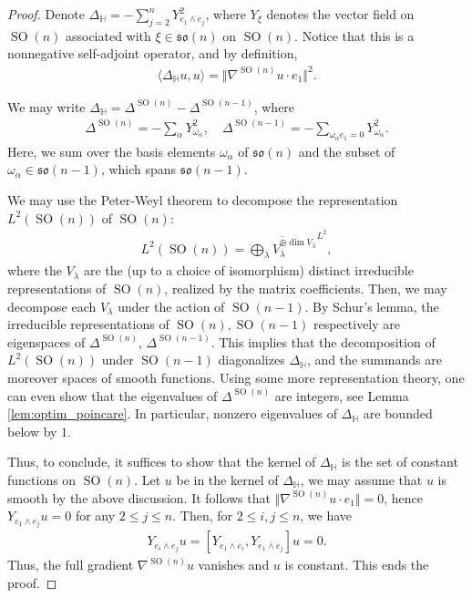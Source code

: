 \documentclass[12pt]{amsart}
\numberwithin{numbering}{section}
\theoremstyle{plain}
\theoremstyle{definition}
\theoremstyle{remark}
\numberwithin{equation}{section}
\DeclareMathOperator{\SO}{SO}
\newcommand{\HH}{\mathbb{H}}
\newcommand{\frk}[1]{\mathfrak{#1}}
\begin{document}
\begin{proof}
Denote $\Delta_{\HH} = - \sum_{j=2}^n Y_{e_1 \wedge e_j}^2$, where $Y_\xi$ denotes the vector field on $\SO(n)$ associated with $\xi \in \frk{so}(n)$ on $\SO(n)$. Notice that this is a nonnegative self-adjoint operator, and by definition,
\begin{align*}
\langle \Delta_{\HH} u, u \rangle = \Vert \nabla^{\SO(n)} u \cdot e_1 \Vert^2.
\end{align*}

We may write $\Delta_{\HH} = \Delta^{\SO(n)} - \Delta^{\SO(n-1)}$, where 
\begin{align*}
\Delta^{\SO(n)} = - \sum_{\alpha} Y_{\omega_\alpha}^2, \quad \Delta^{\SO(n-1)} = - \sum_{\omega_\alpha e_1 = 0} Y_{\omega_\alpha}^2.
\end{align*}
Here, we sum over the basis elements $\omega_\alpha$ of $\frk{so}(n)$ and the subset of $\omega_\alpha \in \frk{so}(n-1)$, which spans $\frk{so}(n-1)$.

We may use the Peter-Weyl theorem \cite[Theorem 4.20]{knapp1996lie} to decompose the representation $L^2(\SO(n))$ of $\SO(n)$:
\begin{align*}
L^2(\SO(n)) = \overline{\bigoplus_\lambda V_\lambda^{\oplus \dim V_\lambda}}^{L^2},
\end{align*}
where the $V_\lambda$ are the (up to a choice of isomorphism) distinct irreducible representations of $\SO(n)$, realized by the matrix coefficients. Then, we may decompose each $V_\lambda$ under the action of $\SO(n-1)$. By Schur's lemma, the irreducible representations of $\SO(n), \SO(n-1)$ respectively are eigenspaces of $\Delta^{\SO(n)}$, $\Delta^{\SO(n-1)}$. This implies that the decomposition of $L^2(\SO(n))$ under $\SO(n-1)$ diagonalizes $\Delta_{\HH}$, and the summands are moreover spaces of smooth functions. Using some more representation theory, one can even show that the eigenvalues of $\Delta^{\SO(n)}$ are integers, see Lemma \ref{lem:optim_poincare}. In particular, nonzero eigenvalues of $\Delta_{\HH}$ are bounded below by $1$.

\medskip

Thus, to conclude, it suffices to show that the kernel of $\Delta_{\HH}$ is the set of constant functions on $\SO(n)$. Let $u$ be in the kernel of $\Delta_{\HH}$, we may assume that $u$ is smooth  by the above discussion. It follows that $\Vert \nabla^{\SO(n)} u \cdot e_1 \Vert = 0$, hence $Y_{e_1 \wedge e_j} u = 0$ for any $2 \leq j \leq n$. Then, for $2 \leq i, j \leq n$, we have 
\begin{align*}
Y_{e_i \wedge e_j} u = [Y_{e_1 \wedge e_i}, Y_{e_1 \wedge e_j}] u = 0.
\end{align*}
Thus, the full gradient $\nabla^{\SO(n)} u$ vanishes and $u$ is constant. This ends the proof.
\end{proof}
\end{document}
